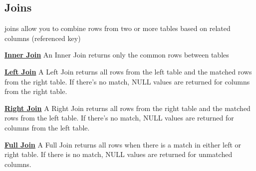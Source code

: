 \subsection{Joins}
\begin{tcolorbox}[title = Definition]
joins allow you to combine rows from two or more tables based on related columns (referenced key)

\textbf{\underline{Inner Join}}
An Inner Join returns only the common rows between tables
\begin{center}
\end{center}
\textbf{\underline{Left Join}}
A Left Join returns all rows from the left table and the matched rows from the right table. If there’s no match,
NULL values are returned for columns from the right table.

\begin{center}
\end{center}
\textbf{\underline{Right Join}}
A Right Join returns all rows from the right table and the matched rows from the left table. If there’s no match,
NULL values are returned for columns from the left table.
\begin{center}
\end{center}
\textbf{\underline{Full Join}}
A Full Join returns all rows when there is a match in either left or right table. If there is no match,
NULL values are returned for unmatched columns.
\begin{center}
\end{center}
\end{tcolorbox}

